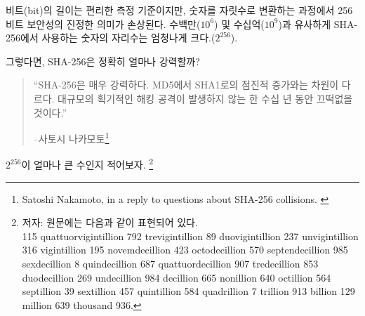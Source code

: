 \begin{comment}
	While bit length is a convenient metric, the true meaning of 256-bit
	security is lost in translation. Similar to the millions ($10^6$) and
	billions ($10^9$) above, the number in SHA-256 is about orders of magnitude
	($2^{256}$).
\end{comment}
비트(bit)의 길이는 편리한 측정 기준이지만, 숫자를 자릿수로 변환하는 과정에서 256비트 보안성의 진정한 의미가 손상된다.
수백만($10^6$) 및 수십억($10^9$)과 유사하게 SHA-256에서 사용하는 숫자의 자리수는 엄청나게 크다.($2^{256}$).
\begin{comment}
	So, how strong is SHA-256, exactly?
\end{comment}
그렇다면, SHA-256은 정확히 얼마나 강력할까?

\begin{comment}
	\begin{quotation}\begin{samepage}
			\enquote{SHA-256 is very strong. It's not like the incremental step from MD5
				to SHA1. It can last several decades unless there's some massive
				breakthrough attack.}
			\begin{flushright} -- Satoshi Nakamoto\footnote{Satoshi Nakamoto, in a reply to questions about SHA-256 collisions. \cite{satoshi-sha256}}
	\end{flushright}\end{samepage}\end{quotation}
\end{comment}
\begin{quotation}\begin{samepage}
		\enquote{SHA-256은 매우 강력하다. MD5에서 SHA1로의 점진적 증가와는 차원이 다르다.
			대규모의 획기적인 해킹 공격이 발생하지 않는 한 수십 년 동안 끄떡없을 것이다.}
		\begin{flushright} --사토시 나카모토\footnote{Satoshi Nakamoto, in a reply to questions about SHA-256 collisions. \cite{satoshi-sha256}}
\end{flushright}\end{samepage}\end{quotation}


$2^{256}$이 얼마나 큰 수인지 적어보자.
\footnote{
	저자: 원문에는 다음과 같이 표현되어 있다. \\
	115 quattuorvigintillion 792 trevigintillion 89 duovigintillion 237
	unvigintillion 316 vigintillion 195 novemdecillion 423 octodecillion 570
	septendecillion 985 sexdecillion 8 quindecillion 687 quattuordecillion 907
	tredecillion 853 duodecillion 269 undecillion 984 decillion 665 nonillion
	640 octillion 564 septillion 39 sextillion 457 quintillion 584 quadrillion 7
	trillion 913 billion 129 million 639 thousand 936.}


